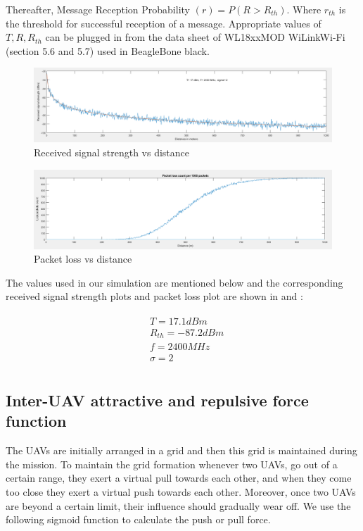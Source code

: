 Thereafter, Message Reception Probability $(r) = P(R > R_{th})$. Where $r_{th}$ is the threshold for successful reception of a message. Appropriate values of $T, R, R_{th}$ can be plugged in from the data sheet of WL18xxMOD WiLink\texttrademark Wi-Fi\textregistered   \cite{wilink} (section 5.6 and 5.7) used in BeagleBone black.

\begin{figure}[hbtp]
\centering
\includegraphics[width=1\textwidth]{ncsuthesis-0.6/Chapter-4/figs/signal_strength}
\caption{Received signal strength vs distance}
\label{fig:signal_strength}
\end{figure}
\begin{figure}[hbtp]
\centering
\includegraphics[width=1\textwidth]{ncsuthesis-0.6/Chapter-4/figs/packet_loss}
\caption{Packet loss vs distance}
\label{fig:packet_loss}
\end{figure}
The values used in our simulation are mentioned below and the corresponding received signal strength plots and packet loss plot are shown in  and :

\begin{eqnarray*}
\begin{aligned}
    & T = 17.1  dBm \\
    & R_{th} = -87.2 dBm \\ 
    & f = 2400 MHz \\
    & \sigma = 2 \\
\end{aligned}
\end{eqnarray*}


\subsection{Inter-UAV attractive and repulsive force function}
The UAVs are initially arranged in a grid and then this grid is maintained during the mission. To maintain the grid formation whenever two UAVs, go out of a certain range, they exert a virtual pull towards each other, and when they come too close they exert a virtual push towards each other. Moreover, once two UAVs are beyond a certain limit, their influence should gradually wear off. We use the following sigmoid function to calculate the push or pull force. 

